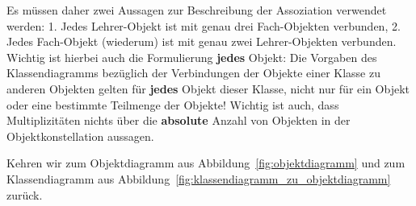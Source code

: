 Es  müssen daher 
zwei Aussagen zur Beschreibung der Assoziation verwendet werden: 1. Jedes Lehrer-Objekt ist mit genau drei Fach-Objekten verbunden, 2. Jedes Fach-Objekt (wiederum) ist mit genau zwei Lehrer-Objekten verbunden. Wichtig ist hierbei auch die Formulierung \textbf{jedes} Objekt: Die Vorgaben des Klassendiagramms bezüglich der Verbindungen der Objekte einer Klasse zu anderen Objekten gelten für \textbf{jedes} Objekt dieser Klasse, nicht nur für ein Objekt oder eine bestimmte Teilmenge der Objekte! Wichtig ist auch, dass Multiplizitäten nichts über die \textbf{absolute} Anzahl von Objekten in der Objektkonstellation aussagen.


\pagebreak

Kehren wir zum Objektdiagramm aus Abbildung~\ref{fig:objektdiagramm} und zum Klassendiagramm aus Abbildung~\ref{fig:klassendiagramm_zu_objektdiagramm} zurück. 

